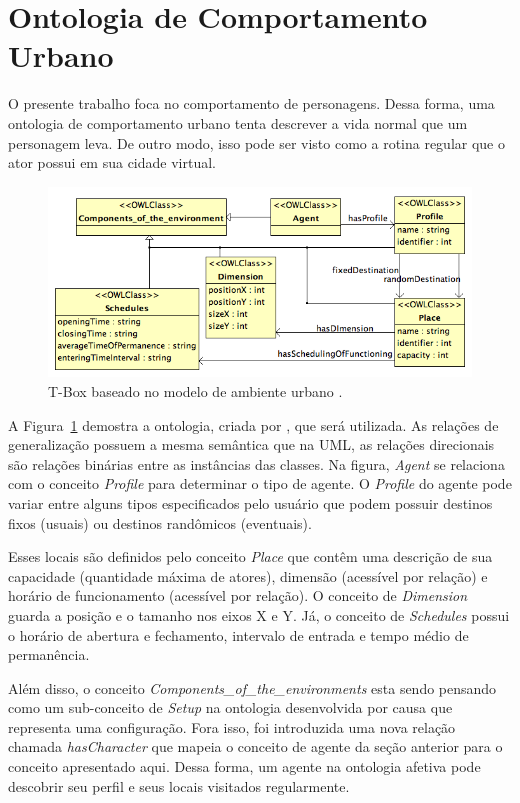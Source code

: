 \section{Ontologia de Comportamento Urbano} \label{ch:aec:ocu}

O presente trabalho foca no comportamento de personagens. Dessa forma, uma
ontologia de comportamento urbano tenta descrever a vida normal que um
personagem leva. De outro modo, isso pode ser visto como a rotina regular que
o ator possui em sua cidade virtual.

\begin{figure}
  \centering
    \includegraphics[width=150mm]{figuras/uem-tbox.png}
  \caption[T-Box baseado no modelo de ambiente urbano.]{T-Box baseado no modelo de ambiente urbano \cite{paiva2005ontology}.}
  \label{fig:UEM:TBOX}
\end{figure}

A Figura~\ref{fig:UEM:TBOX} demostra a ontologia, criada por
\citet{paiva2005ontology}, que será utilizada. As relações de generalização
possuem a mesma semântica que na UML, as relações direcionais são relações
binárias entre as instâncias das classes. Na figura, \emph{Agent} se relaciona
com o conceito \emph{Profile} para determinar o tipo de agente. O
\emph{Profile} do agente pode variar entre alguns tipos especificados pelo
usuário que podem possuir destinos fixos (usuais) ou destinos randômicos
(eventuais).

Esses locais são definidos pelo conceito \emph{Place} que contêm
uma descrição de sua capacidade (quantidade máxima de atores), dimensão
(acessível por relação) e horário de funcionamento (acessível por relação). O
conceito de \emph{Dimension} guarda a posição e o tamanho nos eixos X e Y. Já,
o conceito de \emph{Schedules} possui o horário de abertura e fechamento,
intervalo de entrada e tempo médio de permanência.

Além disso, o conceito \emph{Components\_of\_the\_environments} esta sendo
pensando como um sub-conceito de \emph{Setup} na ontologia
desenvolvida por causa que representa uma configuração.
Fora isso, foi introduzida uma nova relação chamada \emph{hasCharacter} que
mapeia o conceito de agente da seção anterior para o conceito apresentado
aqui. Dessa forma, um agente na ontologia afetiva pode descobrir seu perfil e
seus locais visitados regularmente.

